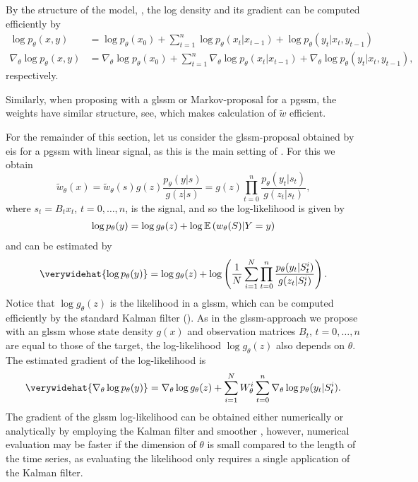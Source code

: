 

By the structure of the model, , the log density and its gradient can be computed efficiently by
\begin{align*}
    \log p_{\theta}(x,y) &= \log p_{\theta}(x_{0}) + \sum_{t = 1}^{n} \log p_{\theta}(x_{t}|x_{t-1}) + \log p_{\theta} (y_{t}|x_{t},y_{t - 1})\\
    \nabla_{\theta}\log p_{\theta}(x,y) &= \nabla_{\theta}\log p_{\theta}(x_{0}) + \sum_{t = 1}^{n} \nabla_{\theta}\log p_{\theta}(x_{t}|x_{t-1}) + \nabla_{\theta}\log p_{\theta} (y_{t}|x_{t},y_{t - 1}),
\end{align*}
respectively. 

Similarly, when proposing with a \acrshort{glssm} or Markov-proposal for a \acrshort{pgssm}, the weights have similar structure, see, which makes calculation of $\tilde w$ efficient. 

For the remainder of this section, let us consider the \acrshort{glssm}-proposal obtained by \acrshort{eis} for a \acrshort{pgssm} with linear signal, as this is the main setting of . For this we obtain 
$$
    \tilde w_{\theta}(x) = \tilde w_{\theta}(s) g(z)\frac{p_{\theta}(y|s)}{g(z|s)} = g(z) \prod_{t = 0}^n \frac{p_{\theta}(y_{t}|s_{t})}{g(z_{t}|s_{t})},
$$
where $s_{t} = B_{t}x_{t}$, $t = 0, \dots, n$, is the signal, and so the log-likelihood is given by 
\begin{align}
    \label{eq:loglik-pgssm-exact}
    \log p_{\theta}(y) = \log g_{\theta}(z) + \log \mathbb E \left(w_{\theta}(S)|Y = y\right)
\end{align}
and can be estimated by
\begin{align}
    \label{eq:loglik-hat-linearsignal}
    \verywidehat{\log p_{\theta}(y)} = \log g_{\theta}(z) + \log \left(\frac{1}{N}\sum_{i=1}^{N}\prod_{t = 0}^{n} \frac{p_{\theta}(y_{t}|S^{i}_{t})}{ g(z_{t}|S^{i}_{t})}\right).
\end{align}
Notice that $\log g_{\theta}(z)$ is the likelihood in a \acrshort{glssm}, which can be computed efficiently by the standard Kalman filter (). As in the \acrshort{glssm}-approach we propose with an \acrshort{glssm} whose state density $g(x)$ and observation matrices $B_{t}$, $t = 0, \dots, n$ are equal to those of the target, the log-likelihood $\log g_{\theta}(z)$ also depends on $\theta$. The estimated gradient of the log-likelihood is 
$$
    \verywidehat{\nabla_{\theta} \log p_{\theta}(y)} = \nabla_{\theta} \log g_{\theta}(z) + \sum_{i=1}^N W^{i}_\theta \sum_{t = 0}^n \nabla_{\theta} \log p_{\theta}(y_{t}|S_{t}^{i}).
$$
The gradient of the \acrshort{glssm} log-likelihood can be obtained either numerically or analytically by employing the Kalman filter and smoother \citep{Koopman1992Exact}, however, numerical evaluation may be faster if the dimension of $\theta$ is small compared to the length of the time series, as evaluating the likelihood only requires a single application of the Kalman filter. 

